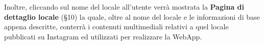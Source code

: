 Inoltre, cliccando sul nome del locale all’utente verrà mostrata la \textbf{Pagina di dettaglio locale} (\S{10}) la quale, oltre al nome del locale e le informazioni di base appena descritte, conterrà i contenuti multimediali relativi a quel locale pubblicati su Instagram ed utilizzati per realizzare la WebApp.
